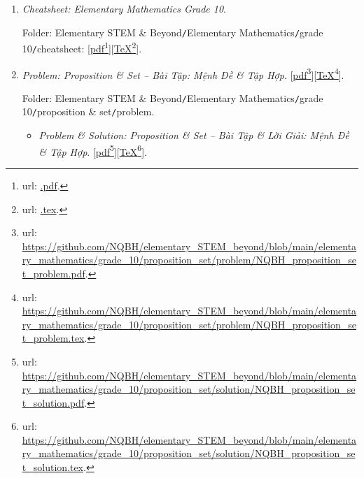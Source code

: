 \documentclass[12pt,twoside]{book}
\begin{document}
\begin{enumerate}
	\item {\it Cheatsheet: Elementary Mathematics Grade 10}.
	
	Folder: {\sf Elementary STEM \& Beyond{\tt/}Elementary Mathematics{\tt/}grade 10{\tt/}cheatsheet}: [\href{.pdf}{pdf}\footnote{{\sc url}: \url{.pdf}.}][\href{.tex}{\TeX}\footnote{{\sc url}: \url{.tex}.}].
	\item {\it Problem: Proposition \& Set -- Bài Tập: Mệnh Đề \& Tập Hợp}. [\href{https://github.com/NQBH/elementary_STEM_beyond/blob/main/elementary_mathematics/grade_10/proposition_set/problem/NQBH_proposition_set_problem.pdf}{pdf}\footnote{{\sc url}: \url{https://github.com/NQBH/elementary_STEM_beyond/blob/main/elementary_mathematics/grade_10/proposition_set/problem/NQBH_proposition_set_problem.pdf}.}][\href{https://github.com/NQBH/elementary_STEM_beyond/blob/main/elementary_mathematics/grade_10/proposition_set/problem/NQBH_proposition_set_problem.tex}{\TeX}\footnote{{\sc url}: \url{https://github.com/NQBH/elementary_STEM_beyond/blob/main/elementary_mathematics/grade_10/proposition_set/problem/NQBH_proposition_set_problem.tex}.}].
	
	Folder: {\sf Elementary STEM \& Beyond{\tt/}Elementary Mathematics{\tt/}grade 10{\tt/}proposition \& set{\tt/}problem}.
	\begin{itemize}
		\item {\it Problem \& Solution: Proposition \& Set -- Bài Tập \& Lời Giải: Mệnh Đề \& Tập Hợp}. [\href{https://github.com/NQBH/elementary_STEM_beyond/blob/main/elementary_mathematics/grade_10/proposition_set/solution/NQBH_proposition_set_solution.pdf}{pdf}\footnote{{\sc url}: \url{https://github.com/NQBH/elementary_STEM_beyond/blob/main/elementary_mathematics/grade_10/proposition_set/solution/NQBH_proposition_set_solution.pdf}.}][\href{https://github.com/NQBH/elementary_STEM_beyond/blob/main/elementary_mathematics/grade_10/proposition_set/solution/NQBH_proposition_set_solution.tex}{\TeX}\footnote{{\sc url}: \url{https://github.com/NQBH/elementary_STEM_beyond/blob/main/elementary_mathematics/grade_10/proposition_set/solution/NQBH_proposition_set_solution.tex}.}].
		

\end{itemize}
\end{enumerate}
\end{document}
